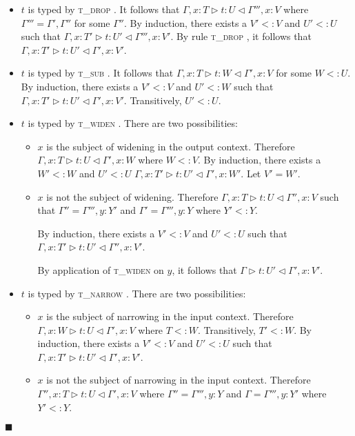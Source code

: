 \documentclass[preprint]{sigplanconf}
\newcommand{\tdrop}{\textsc{t\_drop} }
\newcommand{\tsub}{\textsc{t\_sub} }
\newcommand{\tnarrow}{\textsc{t\_narrow} }
\newcommand{\twiden}{\textsc{t\_widen} }
\newcommand{\typerule}[4]{#1 \triangleright #2 : #3 \triangleleft #4}
\newcommand{\qed}{$\blacksquare$}
\newenvironment{proof}{\vspace{1ex}\noindent{\bf Proof}\hspace{0.5em}}
  {\hfill\qed\vspace{1ex}}
\begin{document}
\begin{proof}
\begin{itemize}
\item $t$ is typed by \tdrop. It follows that
$\typerule{\Gamma, x : T}{t}{U}{\Gamma''', x : V}$ where
$\Gamma''' = \Gamma', \Gamma''$ for some $\Gamma''$. By induction,
there exists a $V' <: V$ and $U' <: U$ such that
$\typerule{\Gamma, x : T'}{t}{U'}{\Gamma''', x : V'}$. By
rule \tdrop, it follows that
$\typerule{\Gamma, x : T'}{t}{U'}{\Gamma', x : V'}$.

\item $t$ is typed by \tsub. It follows that
$\typerule{\Gamma, x : T}{t}{W}{\Gamma', x : V}$ for some $W <: U$.
By induction, there exists a $V' <: V$ and $U' <: W$
such that
$\typerule{\Gamma, x : T'}{t}{U'}{\Gamma', x : V'}$. Transitively,
$U' <: U$.

\item $t$ is typed by \twiden. There are two possibilities:

	\begin{itemize}
	\item $x$ is the subject of widening in the output context.
	Therefore $\typerule{\Gamma, x : T}{t}{U}{\Gamma', x : W}$ where $W <: V$.
	By induction, there exists a $W' <: W$ and $U' <: U$
	$\typerule{\Gamma, x : T'}{t}{U'}{\Gamma', x : W'}$. Let $V' = W'$.

	\item $x$ is not the subject of widening. Therefore
	$\typerule{\Gamma, x : T}{t}{U}{\Gamma'', x : V}$ such that
	$\Gamma'' = \Gamma''', y : Y'$ and $\Gamma' = \Gamma''', y : Y$
	where $Y' <: Y$.

	By induction, there exists a $V' <: V$ and
	$U' <: U$ such that
	$\typerule{\Gamma, x : T'}{t}{U'}{\Gamma'', x : V'}$.

	By application of \twiden on $y$, it follows that
	$\typerule{\Gamma}{t}{U'}{\Gamma', x : V'}$.

	\end{itemize}

\item $t$ is typed by \tnarrow. There are two possibilities:

	\begin{itemize}

	\item $x$ is the subject of narrowing in the input context.
	Therefore $\typerule{\Gamma, x : W}{t}{U}{\Gamma', x : V}$ where $T <: W$.
	Transitively, $T' <: W$.
	By induction, there exists a 
	$V' <: V$ and $U' <: U$
	such that $\typerule{\Gamma, x : T'}{t}{U'}{\Gamma', x : V'}$.

	\item $x$ is not the subject of narrowing in the input context.
	Therefore $\typerule{\Gamma'', x : T}{t}{U}{\Gamma', x : V}$ where
	$\Gamma'' = \Gamma''', y : Y$ and $\Gamma = \Gamma''', y : Y'$ where
	$Y' <: Y$.


\end{itemize}
\end{itemize}
\end{proof}
\end{document}
